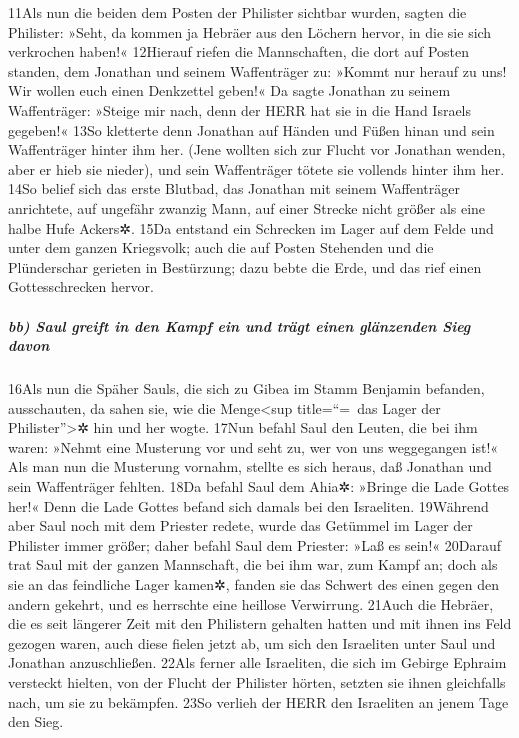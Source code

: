11Als nun die beiden dem Posten der Philister sichtbar wurden, sagten
die Philister: »Seht, da kommen ja Hebräer aus den Löchern hervor, in
die sie sich verkrochen haben!« 12Hierauf riefen die Mannschaften, die
dort auf Posten standen, dem Jonathan und seinem Waffenträger zu: »Kommt
nur herauf zu uns! Wir wollen euch einen Denkzettel geben!« Da sagte
Jonathan zu seinem Waffenträger: »Steige mir nach, denn der HERR hat sie
in die Hand Israels gegeben!« 13So kletterte denn Jonathan auf Händen
und Füßen hinan und sein Waffenträger hinter ihm her. (Jene wollten sich
zur Flucht vor Jonathan wenden, aber er hieb sie nieder), und sein
Waffenträger tötete sie vollends hinter ihm her. 14So belief sich das
erste Blutbad, das Jonathan mit seinem Waffenträger anrichtete, auf
ungefähr zwanzig Mann, auf einer Strecke nicht größer als eine halbe
Hufe Ackers✲. 15Da entstand ein Schrecken im Lager auf dem Felde und
unter dem ganzen Kriegsvolk; auch die auf Posten Stehenden und die
Plünderschar gerieten in Bestürzung; dazu bebte die Erde, und das rief
einen Gottesschrecken hervor.

\hypertarget{bb-saul-greift-in-den-kampf-ein-und-truxe4gt-einen-gluxe4nzenden-sieg-davon}{%
\subparagraph{bb) Saul greift in den Kampf ein und trägt einen
glänzenden Sieg
davon}\label{bb-saul-greift-in-den-kampf-ein-und-truxe4gt-einen-gluxe4nzenden-sieg-davon}}

16Als nun die Späher Sauls, die sich zu Gibea im Stamm Benjamin
befanden, ausschauten, da sahen sie, wie die Menge\textless sup
title=``=~das Lager der Philister''\textgreater✲ hin und her wogte.
17Nun befahl Saul den Leuten, die bei ihm waren: »Nehmt eine Musterung
vor und seht zu, wer von uns weggegangen ist!« Als man nun die Musterung
vornahm, stellte es sich heraus, daß Jonathan und sein Waffenträger
fehlten. 18Da befahl Saul dem Ahia✲: »Bringe die Lade Gottes her!« Denn
die Lade Gottes befand sich damals bei den Israeliten. 19Während aber
Saul noch mit dem Priester redete, wurde das Getümmel im Lager der
Philister immer größer; daher befahl Saul dem Priester: »Laß es sein!«
20Darauf trat Saul mit der ganzen Mannschaft, die bei ihm war, zum Kampf
an; doch als sie an das feindliche Lager kamen✲, fanden sie das Schwert
des einen gegen den andern gekehrt, und es herrschte eine heillose
Verwirrung. 21Auch die Hebräer, die es seit längerer Zeit mit den
Philistern gehalten hatten und mit ihnen ins Feld gezogen waren, auch
diese fielen jetzt ab, um sich den Israeliten unter Saul und Jonathan
anzuschließen. 22Als ferner alle Israeliten, die sich im Gebirge Ephraim
versteckt hielten, von der Flucht der Philister hörten, setzten sie
ihnen gleichfalls nach, um sie zu bekämpfen. 23So verlieh der HERR den
Israeliten an jenem Tage den Sieg.

